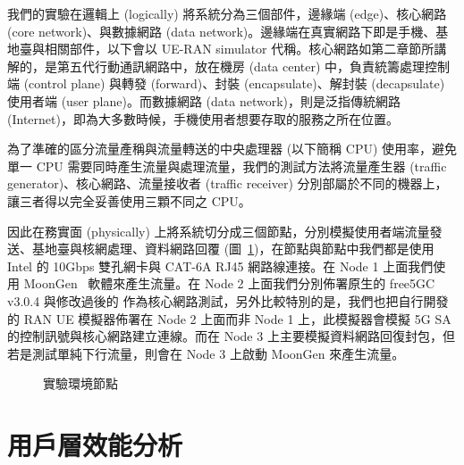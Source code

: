 我們的實驗在邏輯上 (logically) 將系統分為三個部件，邊緣端 (edge)、核心網路 (core network)、與數據網路 (data network)。邊緣端在真實網路下即是手機、基地臺與相關部件，以下會以 UE-RAN simulator 代稱。核心網路如第二章節所講解的，是第五代行動通訊網路中，放在機房 (data center) 中，負責統籌處理控制端 (control plane) 與轉發 (forward)、封裝 (encapsulate)、解封裝 (decapsulate) 使用者端 (user plane)。而數據網路 (data network)，則是泛指傳統網路 (Internet)，即為大多數時候，手機使用者想要存取的服務之所在位置。

為了準確的區分流量產稱與流量轉送的中央處理器 (以下簡稱 CPU) 使用率，避免單一 CPU 需要同時產生流量與處理流量，我們的測試方法將流量產生器 (traffic generator)、核心網路、流量接收者 (traffic receiver) 分別部屬於不同的機器上，讓三者得以完全妥善使用三顆不同之 CPU。

因此在務實面 (physically) 上將系統切分成三個節點，分別模擬使用者端流量發送、基地臺與核網處理、資料網路回覆 (圖~\ref{fig:eva_node})，在節點與節點中我們都是使用 Intel 的 10Gbps 雙孔網卡與 CAT-6A RJ45 網路線連接。在 Node 1 上面我們使用 MoonGen~\cite{paper.MoonGen} 軟體來產生流量。在 Node 2 上面我們分別佈署原生的 free5GC v3.0.4 與修改過後的 \LHCN 作為核心網路測試，另外比較特別的是，我們也把自行開發的 RAN UE 模擬器佈署在 Node 2 上面而非 Node 1 上，此模擬器會模擬 5G SA 的控制訊號與核心網路建立連線。而在 Node 3 上主要模擬資料網路回復封包，但若是測試單純下行流量，則會在 Node 3 上啟動 MoonGen 來產生流量。

\begin{figure}[htbp]
    \centering
    \caption[實驗環境節點]{{\footnotesize 實驗環境節點}}
    \label{fig:eva_node}
\end{figure}

\section{用戶層效能分析}
\label{sec:up_evaluation}

